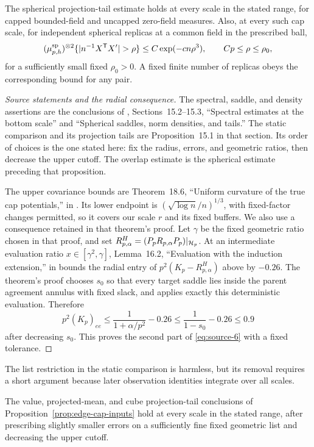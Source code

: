 \begin{proposition}
The spherical projection-tail estimate holds at every scale in the stated
range, for capped bounded-field and uncapped zero-field measures.  Also, at
every such cap scale, for independent
spherical replicas at a common field in the prescribed ball,
\[
 (\mu_{p,h}^{\rm sp})^{\otimes2}
 \{|n^{-1}X^{\mathsf T}X'|>\rho\}
 \le C\exp(-cn\rho^3),\qquad Cp\le\rho\le\rho_0,
\]
for a sufficiently small fixed $\rho_0>0$.  A fixed finite number of
replicas obeys the corresponding bound for any pair.
\end{proposition}

\begin{proof}[Source statements and the radial consequence]
The spectral, saddle, and density assertions are the conclusions of
\cite{CM}, Sections~15.2--15.3, ``Spectral estimates at the bottom
scale'' and ``Spherical saddles, norm densities, and tails.''  The static
comparison and its projection tails are Proposition~15.1 in that section.  Its order of choices is the one stated here:
fix the radius, errors, and geometric ratios, then decrease the upper cutoff.
The overlap estimate is the spherical estimate preceding that proposition.

The upper covariance bounds are Theorem~18.6, ``Uniform curvature of the true
cap potentials,'' in \cite{CM}.  Its lower endpoint is
$(\sqrt{\log n}/n)^{1/3}$, with fixed-factor changes permitted, so it
covers our scale $r$ and its fixed buffers.  We also use a consequence
retained in that theorem's proof.  Let $\gamma$ be the fixed geometric ratio chosen in that proof, and set
$R_{p,\alpha}^H=(P_pR_{p,\alpha}P_p)|_{\mathcal H_p}$.  At an intermediate
evaluation ratio $x\in[\gamma^2,\gamma]$, Lemma~16.2, ``Evaluation with the induction
extension,'' in \cite{CM} bounds the radial entry of
$p^2(K_p-R_{p,\alpha}^H)$ above by $-0.26$.  The theorem's proof chooses
$s_0$ so that every target saddle lies inside the parent agreement annulus
with fixed slack, and applies exactly this deterministic evaluation.
Therefore
\[
 p^2(K_p)_{ee}\le\frac1{1+\alpha/p^2}-0.26
                  \le\frac1{1-s_0}-0.26\le0.9
\]
after decreasing $s_0$.  This proves the second part of
\eqref{eq:source-6} with a fixed tolerance.
\end{proof}

The list restriction in the static comparison is harmless, but its removal
requires a short argument because later observation identities integrate
over all scales.

\begin{lemma}
\label{lem:edge-static-interpolation}
The value, projected-mean, and cube projection-tail conclusions of
Proposition~\ref{prop:edge-cap-inputs} hold at every scale in the stated
range, after prescribing slightly smaller errors on a sufficiently fine
fixed geometric list and decreasing the upper cutoff.
\end{lemma}

